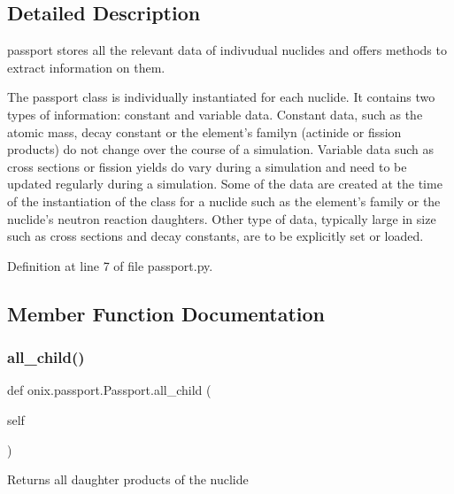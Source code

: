 \subsection{Detailed Description}
\begin{DoxyVerb}passport stores all the relevant data of indivudual nuclides and offers methods to extract information on them.

   The passport class is individually instantiated for each nuclide. It contains two types of information: constant and variable data.
   Constant data, such as the atomic mass, decay constant or the element's familyn (actinide or fission products) do not change over the course of a simulation.
   Variable data such as cross sections or fission yields do vary during a simulation and need to be updated regularly during a simulation.
   Some of the data are created at the time of the instantiation of the class for a nuclide such as the element's family or the nuclide's
   neutron reaction daughters. Other type of data, typically large in size such as cross sections and decay constants, are to be explicitly set or loaded.
\end{DoxyVerb}
 

Definition at line 7 of file passport.\+py.



\subsection{Member Function Documentation}
\mbox{\label{classonix_1_1passport_1_1Passport_a040bb30a2985be2914b51a07e0ddc249}} 
\subsubsection{\texorpdfstring{all\+\_\+child()}{all\_child()}}
{\footnotesize\ttfamily def onix.\+passport.\+Passport.\+all\+\_\+child (\begin{DoxyParamCaption}\item[{}]{self }\end{DoxyParamCaption})}

\begin{DoxyVerb}Returns all daughter products of the nuclide\end{DoxyVerb}
 

